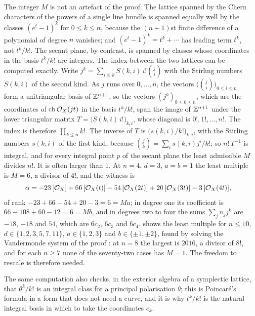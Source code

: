 \begin{remark}%
\label{rem:themultiple}
The integer $M$ is not an artefact of the proof. The lattice spanned by the
Chern characters of the powers of a single line bundle is spanned equally well
by the classes $(e^{t}-1)^{k}$ for $0\le k\le n$, because the $(n+1)$st finite
difference of a polynomial of degree $n$ vanishes; and $(e^{t}-1)^{k}=t^{k}+
\cdots$ has leading term $t^{k}$, not $t^{k}/k!$. The secant plane, by
contrast, is spanned by classes whose coordinates in the basis $t^{k}/k!$ are
integers. The index between the two lattices can be computed exactly. Write
$j^{k}=\sum_{i\le k}S(k,i)\,i!\binom{j}{i}$ with the Stirling numbers $S(k,i)$
of the second kind. As $j$ runs over $0,\dots,n$, the vectors
$\bigl(\binom{j}{i}\bigr)_{0\le i\le n}$ form a unitriangular basis of
$\mathbb{Z}^{n+1}$, so the vectors $(j^{k})_{0\le k\le n}$, which are the coordinates
of $\operatorname{ch}\mathcal{O}_{X}(jt)$ in the basis $t^{k}/k!$, span the image of $\mathbb{Z}^{n+1}$
under the lower triangular matrix $T=\bigl(S(k,i)\,i!\bigr)_{k,i}$, whose
diagonal is $0!,1!,\dots,n!$. The index is therefore $\prod_{k\le n}k!$. The
inverse of $T$ is $\bigl(s(k,i)/k!\bigr)_{k,i}$, with the Stirling numbers
$s(k,i)$ of the first kind, because $\binom{j}{k}=\sum_{i}s(k,i)j^{i}/k!$;
so $n!\,T^{-1}$ is integral, and for every integral point $p$ of the secant
plane the least admissible $M$ divides $n!$. It is often larger than $1$. At $n=4$, $d=3$, $a=b=1$ the least multiple is $M=6$,
a divisor of $4!$, and the witness is
\[
  \alpha=-23\,[\mathcal{O}_{X}]+66\,[\mathcal{O}_{X}(t)]-54\,[\mathcal{O}_{X}(2t)]
         +20\,[\mathcal{O}_{X}(3t)]-3\,[\mathcal{O}_{X}(4t)],
\]
of rank $-23+66-54+20-3=6=Ma$; in degree one its coefficient is
$66-108+60-12=6=Mb$, and in degrees two to four the sums
$\sum_{j}n_{j}j^{k}$ are $-18$, $-18$ and $54$, which are $6c_{2}$, $6c_{3}$ and
$6c_{4}$.  shows the least
multiple for $n\le10$, $d\in\{1,2,3,5,7,11\}$, $a\in\{1,2,3\}$ and
$b\in\{\pm1,\pm2\}$, found by solving the Vandermonde system of the proof
\cite{BMB26}: at $n=8$ the largest is $2016$, a divisor of $8!$, and for each
$n\ge7$ none of the seventy-two cases has $M=1$. The freedom to rescale is
therefore needed.

The same computation also checks, in the exterior algebra of a symplectic lattice,
that $\theta^{k}/k!$ is an integral class for a principal polarisation
$\theta$; this is Poincar\'e's formula in a form that does not need a curve,
and it is why $t^{k}/k!$ is the natural integral basis in which to take the
coordinates $c_{k}$.
\end{remark}

